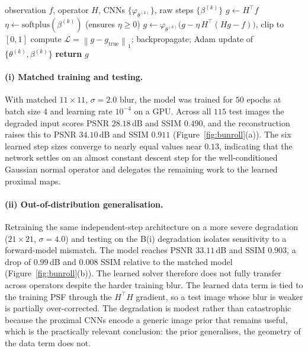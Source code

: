 \documentclass[11pt,a4paper]{article}
\newcommand{\norm}[1]{\left\lVert #1 \right\rVert}
\begin{document}
\begin{algorithm}[H]
\caption{Unrolled PGD forward pass and training step}
\label{alg:unroll}
\begin{algorithmic}[1]
\REQUIRE observation \(f\), operator \(H\), CNNs \(\{\varphi_{\theta^{(k)}}\}\), raw steps \(\{\beta^{(k)}\}\)
\STATE \(g \leftarrow H^\top f\)
  \STATE \(\eta \leftarrow \mathrm{softplus}(\beta^{(k)})\) \hfill (ensures \(\eta\ge 0\))
  \STATE \(g \leftarrow \varphi_{\theta^{(k)}}\!\big(g - \eta\,H^\top(Hg-f)\big)\), \quad clip to \([0,1]\)
\ENDFOR
\STATE compute \(\mathcal{L}=\norm{g-g_{\text{true}}}_1\); backpropagate; Adam update of \(\{\theta^{(k)},\beta^{(k)}\}\)
\STATE \textbf{return} \(g\)
\end{algorithmic}
\end{algorithm}

\paragraph{(i) Matched training and testing.}
With matched \(11\times11\), \(\sigma=2.0\) blur, the model was trained for
\(50\) epochs at batch size \(4\) and learning rate \(10^{-4}\) on a GPU. Across
all \(115\) test images the degraded input scores PSNR \(28.18\)\,dB and SSIM
\(0.490\), and the reconstruction raises this to PSNR \(34.10\)\,dB and SSIM
\(0.911\) (Figure~\ref{fig:bunroll}(a)). The six learned step sizes converge to nearly
equal values near \(0.13\), indicating that the network settles on an almost
constant descent step for the well-conditioned Gaussian normal operator and
delegates the remaining work to the learned proximal maps.

\paragraph{(ii) Out-of-distribution generalisation.}
Retraining the same independent-step architecture on a more severe degradation
(\(21\times21\), \(\sigma=4.0\)) and testing on the B(i) degradation isolates
sensitivity to a forward-model mismatch. The model reaches PSNR \(33.11\)\,dB
and SSIM \(0.903\), a drop of \(0.99\)\,dB and \(0.008\) SSIM relative to the
matched model (Figure~\ref{fig:bunroll}(b)). The learned solver therefore does not
fully transfer across operators despite the harder training blur. The learned
data term is tied to the training PSF through the \(H^\top H\) gradient, so a
test image whose blur is weaker is partially over-corrected. The degradation is
modest rather than catastrophic because the proximal CNNs encode a generic image
prior that remains useful, which is the practically relevant conclusion: the
prior generalises, the geometry of the data term does not.
\end{document}
